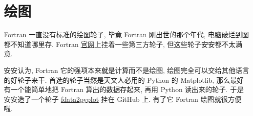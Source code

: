 \chapter{绘图}

Fortran 一直没有标准的绘图轮子, 毕竟 Fortran 刚出世的那个年代, 电脑破烂到图都不知道哪里存. Fortran \href{https://fortran-lang.org/packages/graphics/}{官网}上挂着一些第三方轮子, 但这些轮子安安都不太满意.

安安认为, Fortran 它的强项本来就是计算而不是绘图, 绘图完全可以交给其他语言的好轮子来干. 首选的轮子当然是天文人必用的 Python 的 Matplotlib, 那么最好有一个能简单地把 Fortran 算出的数据存起来, 再用 Python 读出来的轮子. 于是安安造了一个轮子 \href{https://github.com/GasinAn/fdata2pyplot}{fdata2pyplot} 挂在 GitHub 上. 有了它 Fortran 绘图就很方便啦.
